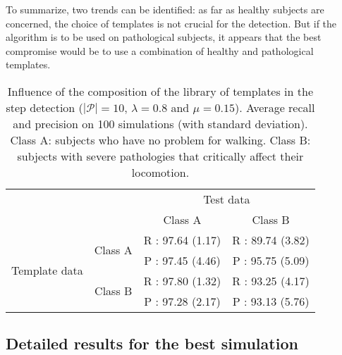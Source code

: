 \documentclass[../thesis.tex]{subfiles}
\begin{document}
To summarize, two trends can be identified: as far as healthy subjects are concerned, the choice of templates is not crucial for the detection. But if the algorithm is to be used on pathological subjects, it appears that the best compromise would be to use a combination of healthy and pathological templates.



\begin{table}[t]

\begin{center}
\begin{tabular}{|c|c|c|c|}
  \cline{3-4}
\multicolumn{2}{c|}{} & \multicolumn{2}{c|}{Test data}\\
 \cline{3-4}
\multicolumn{2}{c|}{} & Class A & Class B \\
 \cline{1-4}
 \multirow{4}{*}{Template data} &  \multirow{2}{*}{Class A} & R : 97.64 (1.17) & R : 89.74 (3.82)\\
& & P : 97.45 (4.46)  & P : 95.75 (5.09)\\
 \cline{2-4}
& \multirow{2}{*}{Class B} & R : 97.80 (1.32) & R : 93.25 (4.17) \\
& & P :  97.28 (2.17)	  & P : 93.13 (5.76)\\
\hline
\end{tabular}             \end{center}
\caption{Influence of the composition of the library of templates in the step detection ($|\mathcal{P}|=10$, $\lambda=0.8$ and $\mu=0.15$). Average recall and precision on 100 simulations (with standard deviation). Class A: subjects who have no problem for walking. Class B:  subjects with severe pathologies that critically affect their locomotion. }\label{tab:walk_sd:influence_patho}
\end{table}




\subsection{Detailed results for the best simulation}
\label{sub:walk_sd:best_simu}
\end{document}
